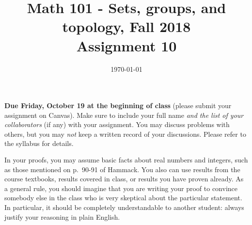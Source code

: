 \documentclass{amsart}
\title[Math 101, Fall 2018: assignment 10]{Math 101 - Sets, groups, and topology, Fall 2018 \\ Assignment 10}
\date{\today}
\theoremstyle{definition}
\begin{document}

\maketitle

\textbf{Due Friday, October 19 at the beginning of class} (please submit your assignment on Canvas). Make sure to include your full name \emph{and the list of your collaborators} (if any) with your assignment. You may discuss problems with others, but you may \emph{not} keep a written record of your discussions. Please refer to the syllabus for details.

In your proofs, you may assume basic facts about real numbers and integers, such as those mentioned on p.~90-91 of Hammack. You also can use results from the course textbooks, results covered in class, or results you have proven already. As a general rule, you should imagine that you are writing your proof to convince somebody else in the class who is very skeptical about the particular statement. In particular, it should be completely understandable to another student: always justify your reasoning in plain English. 
\end{document}

